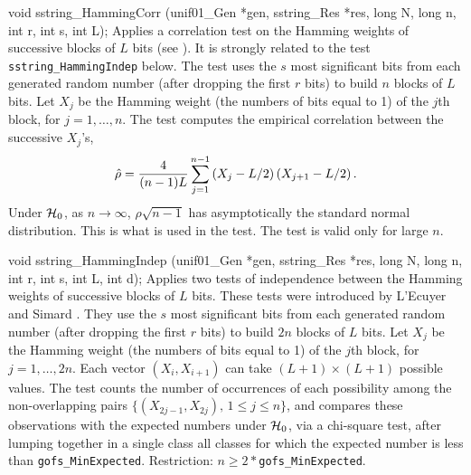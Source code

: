 void sstring_HammingCorr (unif01_Gen *gen, sstring_Res *res,
                          long N, long n, int r, int s, int L);
\endcode
 \tab
  Applies a correlation test on the Hamming weights
  of successive blocks of $L$ bits (see \cite{rLEC99e}).
%
%
%
  It is strongly related to the test {\tt sstring\_HammingIndep} below.
  The test uses the $s$ most significant bits from each generated random
  number (after dropping the first $r$ bits) to build $n$ blocks of $L$ bits.
  Let $X_j$ be the Hamming weight (the numbers of bits equal to 1) 
  of the $j$th block, for $j=1,\dots,n$.
  The test computes the empirical correlation between the
  successive  $X_j$'s,
 $$
  \hat\rho = {4 \over (n-1) L } \sum_{j=1}^{n-1} 
      \left(X_j -  L/2\right) \left(X_{j+1} - L/2\right).
 $$
  Under $\mathcal{H}_0$, as $n\to\infty$, $\hat\rho \sqrt{n-1}$ has asymptotically
  the standard normal distribution.
  This is what is used in the test.
  The test is valid only for large $n$.
 \endtab
\code


void sstring_HammingIndep (unif01_Gen *gen, sstring_Res *res,
                           long N, long n, int r, int s, int L, int d);
\endcode
 \tab
  Applies two tests of independence between the Hamming weights 
  of successive blocks of $L$ bits.
%
%
%
  These tests were introduced by L'Ecuyer and Simard \cite{rLEC99e}.
  They use the $s$ most significant bits from each generated random number
  (after dropping the first $r$ bits)  to  build $2n$ blocks of $L$ bits.
  Let $X_j$ be the Hamming weight (the numbers of bits equal to 1) 
  of the $j$th block, for $j=1,\dots,2n$.
  Each vector $(X_i, X_{i+1})$ can take $(L+1)\times(L+1)$ possible
  values.  The test counts the number of occurrences of each possibility
  among the non-overlapping pairs $\{(X_{2j-1}, X_{2j}),\, 1\le j\le n\}$,
  and compares these observations with the expected numbers under $\mathcal{H}_0$,
  via a chi-square test, after lumping together in a single class
  all classes for which the expected number is less than
  {\tt gofs\_MinExpected}.  Restriction: $n \ge 2*${\tt gofs\_MinExpected}.

